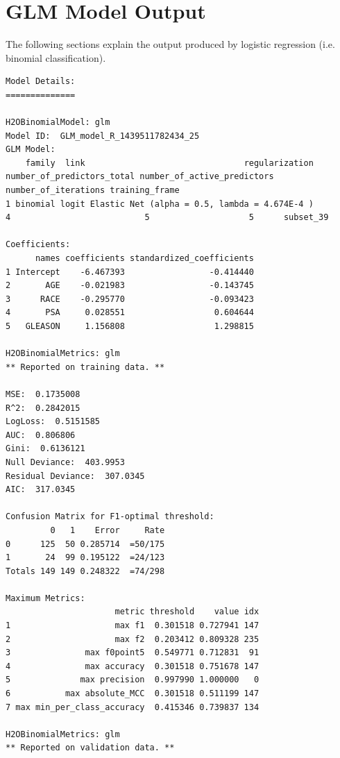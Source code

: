 
\section{GLM Model Output}

The following sections explain the output produced by logistic regression (i.e. binomial classification).

\bigskip
\waterExampleInR


\begin{lstlisting}[style=output]
Model Details:
==============

H2OBinomialModel: glm
Model ID:  GLM_model_R_1439511782434_25 
GLM Model:
    family  link                                regularization number_of_predictors_total number_of_active_predictors number_of_iterations training_frame
1 binomial logit Elastic Net (alpha = 0.5, lambda = 4.674E-4 )                          4                           5                    5      subset_39

Coefficients:
      names coefficients standardized_coefficients
1 Intercept    -6.467393                 -0.414440
2       AGE    -0.021983                 -0.143745
3      RACE    -0.295770                 -0.093423
4       PSA     0.028551                  0.604644
5   GLEASON     1.156808                  1.298815

H2OBinomialMetrics: glm
** Reported on training data. **

MSE:  0.1735008
R^2:  0.2842015
LogLoss:  0.5151585
AUC:  0.806806
Gini:  0.6136121
Null Deviance:  403.9953
Residual Deviance:  307.0345
AIC:  317.0345

Confusion Matrix for F1-optimal threshold:
         0   1    Error     Rate
0      125  50 0.285714  =50/175
1       24  99 0.195122  =24/123
Totals 149 149 0.248322  =74/298

Maximum Metrics:
                      metric threshold    value idx
1                     max f1  0.301518 0.727941 147
2                     max f2  0.203412 0.809328 235
3               max f0point5  0.549771 0.712831  91
4               max accuracy  0.301518 0.751678 147
5              max precision  0.997990 1.000000   0
6           max absolute_MCC  0.301518 0.511199 147
7 max min_per_class_accuracy  0.415346 0.739837 134

H2OBinomialMetrics: glm
** Reported on validation data. **


\end{lstlisting}
